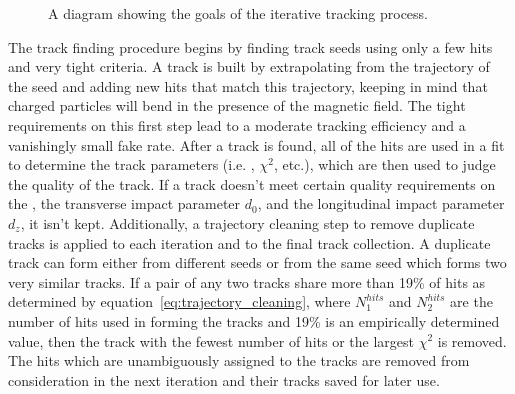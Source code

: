 \begin{figure}[!hbt]
    \centering
    \caption{A diagram showing the goals of the iterative tracking process.}
    \label{fig:efficiency_vs_fake_rate}
\end{figure}

The track finding procedure begins by finding track seeds using only a few hits and very tight criteria.
A track is built by extrapolating from the trajectory of the seed and adding new hits that match this trajectory, keeping in mind that charged particles will bend in the presence of the magnetic field.
The tight requirements on this first step lead to a moderate tracking efficiency and a vanishingly small fake rate.
After a track is found, all of the hits are used in a fit to determine the track parameters (i.e. \pt, $\chi^{2}$, etc.), which are then used to judge the quality of the track.
If a track doesn't meet certain quality requirements on the \pt, the transverse impact parameter $d_{0}$, and the longitudinal impact parameter $d_{z}$, it isn't kept.
Additionally, a trajectory cleaning step to remove duplicate tracks is applied to each iteration and to the final track collection.
A duplicate track can form either from different seeds or from the same seed which forms two very similar tracks.
If a pair of any two tracks share more than 19\% of hits as determined by equation~\ref{eq:trajectory_cleaning}, where $N^{hits}_{1}$ and $N^{hits}_{2}$ are the number of hits used in forming the tracks and 19\% is an empirically determined value, then the track with the fewest number of hits or the largest $\chi^{2}$ is removed.
The hits which are unambiguously assigned to the tracks are removed from consideration in the next iteration and their tracks saved for later use.

